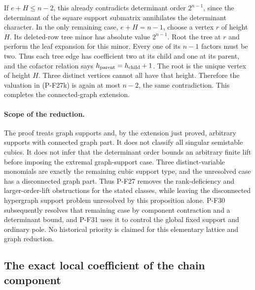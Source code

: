\documentclass[11pt,a4paper]{article}
\begin{document}
If $e+H\le n-2$, this already contradicts determinant order
$2^{n-1}$, since the determinant of the square support submatrix
annihilates the determinant character. In the only remaining case,
$e+H=n-1$, choose a vertex $r$ of height $H$. Its deleted-row tree
minor has absolute value $2^{n-1}$. Root the tree at $r$ and perform
the leaf expansion for this minor. Every one of its $n-1$ factors
must be two. Thus each tree edge has coefficient two at its child
and one at its parent, and the cofactor relation says
$h_{\rm parent}=h_{\rm child}+1$. The root is the unique vertex of
height $H$. Three distinct vertices cannot all have that height.
Therefore the valuation in (P-F27k) is again at most $n-2$, the
same contradiction. This completes the connected-graph extension.

\paragraph{Scope of the reduction.}
The proof treats graph supports and, by the extension just proved,
arbitrary supports with connected graph part. It does not classify
all singular semistable cubics. It does not infer
that the determinant order bounds an arbitrary finite lift
before imposing the extremal graph-support case. Three
distinct-variable monomials are exactly the remaining
cubic support type, and the unresolved case has a disconnected
graph part. Thus P-F27 removes the rank-deficiency and
larger-order-lift obstructions for the stated classes, while
leaving the disconnected hypergraph support problem unresolved by
this proposition alone. P-F30 subsequently resolves that remaining
case by component contraction and a determinant bound, and P-F31
uses it to control the global fixed support and ordinary pole.
No historical priority is claimed for this elementary
lattice and graph reduction.


\subsection{The exact local coefficient of the chain component}
\end{document}
